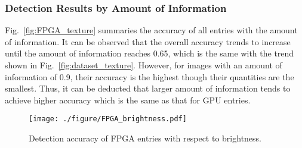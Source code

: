 \documentclass[10pt,journal,compsoc]{IEEEtran}
\begin{document}
\subsubsection{Detection Results by Amount of Information}\label{fpga_texture}
Fig.~\ref{fig:FPGA_texture} summaries the accuracy of all entries with the amount of information.
It can be observed that the overall accuracy trends to increase until the amount of information reaches 0.65, which is the same with the trend shown in Fig.~\ref{fig:dataset_texture}.
However, for images with an amount of information of 0.9, their accuracy is the highest though their quantities are the smallest.
Thus, it can be deducted that larger amount of information tends to achieve higher accuracy which is the same as that for GPU entries.










\begin{figure}%
\centering
  \texttt{[image: ./figure/FPGA\_brightness.pdf]}
  \caption{Detection accuracy of FPGA entries with respect to brightness.}
  \label{fig:FPGA_brightness}
\end{figure}
\end{document}

